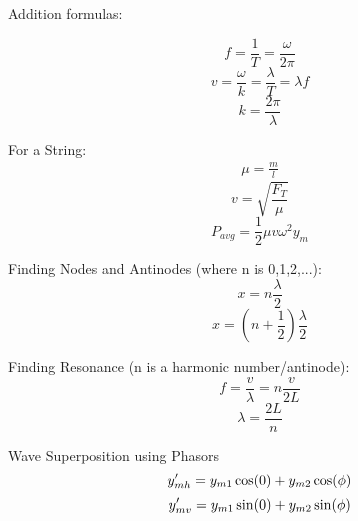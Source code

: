 \documentclass[11pt]{article}
\begin{document}
    \begin{minipage}[t]{0.5\textwidth}
    \noindent Addition formulas:

    \begin{equation}
        f = \frac{1}{T} = \frac{\omega}{2\pi} \tag{frequency}
    \end{equation}
    \begin{equation}
        v = \frac{\omega}{k} = \frac{\lambda}{T} = \lambda f \tag{wave velocity}
    \end{equation}
    \begin{equation}
        k = \frac{2\pi}{\lambda} \tag{angular wave number}
    \end{equation}
    \end{minipage}
    \begin{minipage}[t]{0.46\textwidth}
    \noindent For a String:
    \begin{align}
        \mu = \frac{m}{l} \tag{linear density}
    \end{align}
    \begin{equation}
        v = \sqrt {\frac{F_T}{\mu}} \tag{wave velocity}
    \end{equation}
    \begin{equation}
        P_{avg} = \frac{1}{2} \mu v \omega^2 y_m \tag{average power}
    \end{equation}
    \end{minipage}

\noindent Finding Nodes and Antinodes (where n is 0,1,2,...):
    \begin{equation}
        x = n \frac{\lambda}{2} \tag{node position}
    \end{equation}
    \begin{equation}
        x = (n + \frac{1}{2})\frac{\lambda}{2} \tag{antinode position}
    \end{equation}

    \noindent Finding Resonance (n is a harmonic number/antinode):
    \begin{equation}
        f = \frac{v}{\lambda} = n \frac{v}{2L} \tag{Resonant frequency}
    \end{equation}
    \begin{equation}
        \lambda = \frac{2L}{n} \tag{wavelength \lambda}
    \end{equation}

    \noindent Wave Superposition using Phasors
    \begin{equation}
        y'_{mh} = y_{m1}\cos(0) + y_{m2}\cos(\phi) \notag
    \end{equation}
    \begin{equation}
        y'_{mv} = y_{m1}\sin(0) + y_{m2}\sin(\phi) \notag
    \end{equation}
\end{document}
